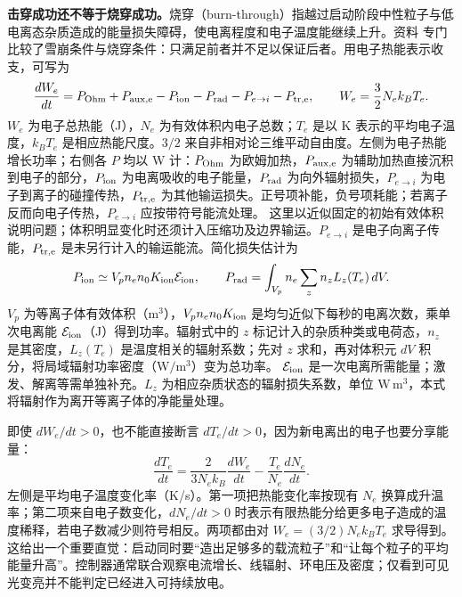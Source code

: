 \documentclass[12pt,fontset=none]{ctexart}
\numberwithin{equation}{section}
\numberwithin{table}{section}
\numberwithin{figure}{section}
\begin{document}
\textbf{击穿成功还不等于烧穿成功。}烧穿（burn-through）指越过启动阶段中性粒子与低电离态杂质造成的能量损失障碍，使电离程度和电子温度能继续上升。资料 \cite{C4} 专门比较了雪崩条件与烧穿条件：只满足前者并不足以保证后者。用电子热能表示收支，可写为
\begin{equation}\label{eq:cycle-burnthrough}
 \frac{dW_e}{dt}=P_{\rm Ohm}+P_{\rm aux,e}
 -P_{\rm ion}-P_{\rm rad}-P_{e\to i}-P_{\rm tr,e},
 \qquad W_e=\frac32N_ek_BT_e.
\end{equation}
$W_e$ 为电子总热能（J），$N_e$ 为有效体积内电子总数；$T_e$ 是以 K 表示的平均电子温度，$k_BT_e$ 是相应热能尺度。$3/2$ 来自非相对论三维平动自由度。左侧为电子热能增长功率；右侧各 $P$ 均以 W 计：$P_{\rm Ohm}$ 为欧姆加热，$P_{\rm aux,e}$ 为辅助加热直接沉积到电子的部分，$P_{\rm ion}$ 为电离吸收的电子能量，$P_{\rm rad}$ 为向外辐射损失，$P_{e\to i}$ 为电子到离子的碰撞传热，$P_{\rm tr,e}$ 为其他输运损失。正号项补能，负号项耗能；若离子反而向电子传热，$P_{e\to i}$ 应按带符号能流处理。
这里以近似固定的初始有效体积说明问题；体积明显变化时还须计入压缩功及边界输运。$P_{e\to i}$ 是电子向离子传能，$P_{\rm tr,e}$ 是未另行计入的输运能流。简化损失估计为
\begin{equation}\label{eq:cycle-atomicloss}
 P_{\rm ion}\simeq V_p n_en_0K_{\rm ion}\mathcal E_{\rm ion},
 \qquad P_{\rm rad}=\int_{V_p}n_e\sum_z n_z L_z(T_e)\,dV.
\end{equation}
$V_p$ 为等离子体有效体积（$\mathrm{m^3}$），$V_pn_en_0K_{\rm ion}$ 是均匀近似下每秒的电离次数，乘单次电离能 $\mathcal E_{\rm ion}$（J）得到功率。辐射式中的 $z$ 标记计入的杂质种类或电荷态，$n_z$ 是其密度，$L_z(T_e)$ 是温度相关的辐射系数；先对 $z$ 求和，再对体积元 $dV$ 积分，将局域辐射功率密度（$\mathrm{W/m^3}$）变为总功率。
$\mathcal E_{\rm ion}$ 是一次电离所需能量；激发、解离等需单独补充。$L_z$ 为相应杂质状态的辐射损失系数，单位 $\mathrm{W\,m^3}$，本式将辐射作为离开等离子体的净能量处理。

即使 $dW_e/dt>0$，也不能直接断言 $dT_e/dt>0$，因为新电离出的电子也要分享能量：
\begin{equation}\label{eq:cycle-temperature}
 \frac{dT_e}{dt}=\frac{2}{3N_ek_B}\frac{dW_e}{dt}
 -\frac{T_e}{N_e}\frac{dN_e}{dt}.
\end{equation}
左侧是平均电子温度变化率（K/s）。第一项把热能变化率按现有 $N_e$ 换算成升温率；第二项来自电子数变化，$dN_e/dt>0$ 时表示有限热能分给更多电子造成的温度稀释，若电子数减少则符号相反。两项都由对 $W_e=(3/2)N_ek_BT_e$ 求导得到。
这给出一个重要直觉：启动同时要``造出足够多的载流粒子''和``让每个粒子的平均能量升高''。控制器通常联合观察电流增长、线辐射、环电压及密度；仅看到可见光变亮并不能判定已经进入可持续放电。
\end{document}
